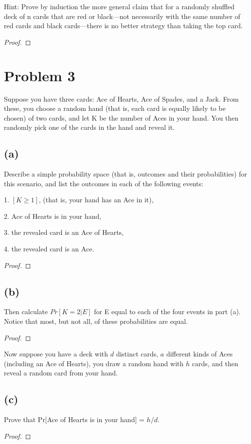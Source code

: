 \documentclass[14pt]{extarticle}
\begin{document}
Hint: Prove by induction the more general claim that for a randomly shuffled deck of n cards that are red or black—not necessarily with the same number of red cards and black cards—there is no better strategy
than taking the top card.
\begin{proof}
\end{proof}

\section{Problem 3}
Suppose you have three cards: Ace of Hearts, Ace of Spades, and a Jack. From these, you choose a random hand (that is, each card is equally likely to be chosen) of two cards, and let K be the number of Aces in your hand. You then randomly pick one of the cards in the hand and reveal it.
\subsection{(a)}
Describe a simple probability space (that is, outcomes and their probabilities) for this scenario, and list the outcomes in each of the following events:

1. $[K \geq 1]$, (that is, your hand has an Ace in it),

2. Ace of Hearts is in your hand,

3. the revealed card is an Ace of Hearts,

4. the revealed card is an Ace.
\begin{proof}
\end{proof}

\subsection{(b)}
Then calculate $Pr[K = 2 | E]$ for E equal to each of the four events in part (a). Notice that most, but not all, of these probabilities are equal. 
\begin{proof}
\end{proof}

Now suppose you have a deck with $d$ distinct cards, $a$ different kinds of Aces (including an Ace of Hearts), you draw a random hand with $h$ cards, and then reveal a random card from your hand.

\subsection{(c)}
Prove that Pr[Ace of Hearts is in your hand] = $h/d$.
\begin{proof}
\end{proof}
\end{document}

